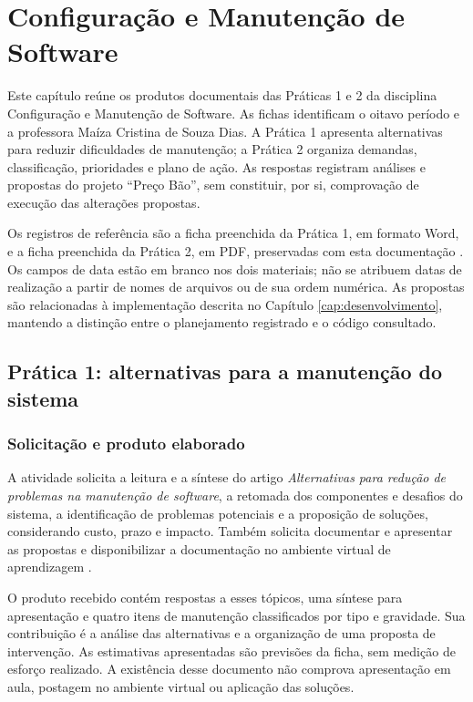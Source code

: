 \chapter{Configuração e Manutenção de Software}\label{cap:configuracao_manutencao}

Este capítulo reúne os produtos documentais das Práticas 1 e 2 da disciplina Configuração e Manutenção de Software. As fichas identificam o oitavo período e a professora Maíza Cristina de Souza Dias. A Prática 1 apresenta alternativas para reduzir dificuldades de manutenção; a Prática 2 organiza demandas, classificação, prioridades e plano de ação. As respostas registram análises e propostas do projeto ``Preço Bão'', sem constituir, por si, comprovação de execução das alterações propostas.

Os registros de referência são a ficha preenchida da Prática 1, em formato Word, e a ficha preenchida da Prática 2, em PDF, preservadas com esta documentação \cite{pratica01,pratica02}. Os campos de data estão em branco nos dois materiais; não se atribuem datas de realização a partir de nomes de arquivos ou de sua ordem numérica. As propostas são relacionadas à implementação descrita no Capítulo \ref{cap:desenvolvimento}, mantendo a distinção entre o planejamento registrado e o código consultado.

\section{Prática 1: alternativas para a manutenção do sistema}\label{sec:pratica01}

\subsection{Solicitação e produto elaborado}

A atividade solicita a leitura e a síntese do artigo \textit{Alternativas para redução de problemas na manutenção de software}, a retomada dos componentes e desafios do sistema, a identificação de problemas potenciais e a proposição de soluções, considerando custo, prazo e impacto. Também solicita documentar e apresentar as propostas e disponibilizar a documentação no ambiente virtual de aprendizagem \cite{pratica01}.

O produto recebido contém respostas a esses tópicos, uma síntese para apresentação e quatro itens de manutenção classificados por tipo e gravidade. Sua contribuição é a análise das alternativas e a organização de uma proposta de intervenção. As estimativas apresentadas são previsões da ficha, sem medição de esforço realizado. A existência desse documento não comprova apresentação em aula, postagem no ambiente virtual ou aplicação das soluções.

